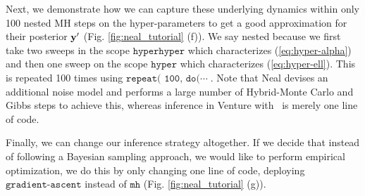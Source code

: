 Next, we demonstrate how we can capture these underlying dynamics within only
100  nested \ac{MH} steps on the hyper-parameters to get a good approximation
for their posterior $\mathbf{y}^\prime$ (Fig. \ref{fig:neal_tutorial} (f)).
We say nested because we first take two sweeps in the scope
$\texttt{hyperhyper}$ which characterizes (\ref{eq:hyper-alpha}) and then one
sweep on the scope $\texttt{hyper}$ which characterizes (\ref{eq:hyper-ell}).
This is repeated 100 times using $\texttt{repeat( 100, do(}\cdots\;$.
Note that Neal devises an additional noise model and performs a large number of Hybrid-Monte Carlo and Gibbs steps to achieve this, whereas inference in Venture with \gpmem\ is merely one line of code. 

Finally, we can change our inference strategy altogether. If we decide that instead of
following a Bayesian sampling approach, we would like to perform empirical optimization,
we do this by only changing one line of code, deploying $\texttt{gradient-ascent}$ instead
of $\texttt{mh}$ (Fig. \ref{fig:neal_tutorial} (g)). 

